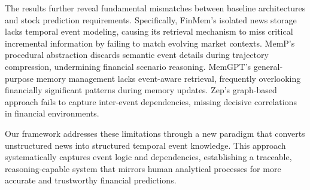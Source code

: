 \documentclass[sigconf, nonacm]{acmart} %
\begin{document}
The results further reveal fundamental mismatches between baseline architectures and stock prediction requirements. Specifically, FinMem's isolated news storage lacks temporal event modeling, causing its retrieval mechanism to miss critical incremental information by failing to match evolving market contexts. MemP's procedural abstraction discards semantic event details during trajectory compression, undermining financial scenario reasoning. MemGPT's general-purpose memory management lacks event-aware retrieval, frequently overlooking financially significant patterns during memory updates. Zep's graph-based approach fails to capture inter-event dependencies, missing decisive correlations in financial environments.

Our framework addresses these limitations through a 
new 
paradigm that converts unstructured news into structured temporal event knowledge. This approach systematically captures event logic and dependencies, establishing a traceable, reasoning-capable system that mirrors human analytical processes for more accurate and trustworthy financial predictions.

\end{document}
